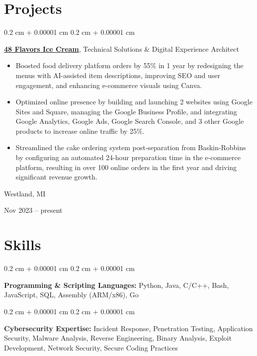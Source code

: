 \documentclass[10pt, a4paper]{article}
\newenvironment{highlights}{
    \begin{itemize}[
        topsep=0.1 cm,
        parsep=0.1 cm,
        partopsep=0pt,
        itemsep=0pt,
        leftmargin=0.2 cm + 10pt
    ]
}{
    \end{itemize}
} %
\newenvironment{onecolentry}{
    \begin{adjustwidth}{
        0.2 cm + 0.00001 cm
    }{
        0.2 cm + 0.00001 cm
    }
}{
    \end{adjustwidth}
} %
\newenvironment{twocolentry}[2][]{
    \onecolentry
    \def\secondColumn{#2}
    \setcolumnwidth{\fill, 4 cm}
    \begin{paracol}{2}
}{
    \switchcolumn \raggedleft \secondColumn
    \end{paracol}
    \endonecolentry
} %
\begin{document}
    
    \section{Projects}



        
        \begin{twocolentry}{
            Westland, MI

        Nov 2023 – present
        }
            \textbf{\href{https://48flavorsicecream.com}{48 Flavors Ice Cream}}, Technical Solutions \& Digital Experience Architect
            \begin{highlights}
                \item Boosted food delivery platform orders by 55\% in 1 year by redesigning the menus with AI-assisted item descriptions, improving SEO and user engagement, and enhancing e-commerce visuals using Canva.
                \item Optimized online presence by building and launching 2 websites using Google Sites and Square, managing the Google Business Profile, and integrating Google Analytics, Google Ads, Google Search Console, and 3 other Google products to increase online traffic by 25\%.
                \item Streamlined the cake ordering system post-separation from Baskin-Robbins by configuring an automated 24-hour preparation time in the e-commerce platform, resulting in over 100 online orders in the first year and driving significant revenue growth.
            \end{highlights}
        \end{twocolentry}



    
    \section{Skills}



        
        \begin{onecolentry}
            \textbf{Programming \& Scripting Languages:} Python, Java, C/C++, Bash, JavaScript, SQL, Assembly (ARM/x86), Go
        \end{onecolentry}

        \vspace{0.5 cm}

        \begin{onecolentry}
            \textbf{Cybersecurity Expertise:} Incident Response, Penetration Testing, Application Security, Malware Analysis, Reverse Engineering, Binary Analysis, Exploit Development, Network Security, Secure Coding Practices
        \end{onecolentry}
\end{document}
